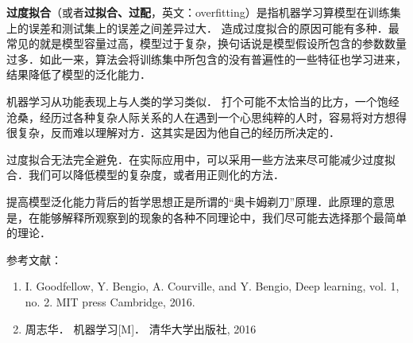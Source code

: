 
\textbf{过度拟合}（或者\textbf{过拟合、过配}，英文：overfitting）是指机器学习算模型在训练集上的误差和测试集上的误差之间差异过大．
造成过度拟合的原因可能有多种．最常见的就是模型容量过高，模型过于复杂，换句话说是模型假设所包含的参数数量过多．如此一来，算法会将训练集中所包含的没有普遍性的一些特征也学习进来，结果降低了模型的泛化能力．

机器学习从功能表现上与人类的学习类似．
打个可能不太恰当的比方，一个饱经沧桑，经历过各种复杂人际关系的人在遇到一个心思纯粹的人时，容易将对方想得很复杂，反而难以理解对方．这其实是因为他自己的经历所决定的．

过度拟合无法完全避免．在实际应用中，可以采用一些方法来尽可能减少过度拟合．我们可以降低模型的复杂度，或者用正则化的方法．

提高模型泛化能力背后的哲学思想正是所谓的“奥卡姆剃刀”原理．此原理的意思是，在能够解释所观察到的现象的各种不同理论中，我们尽可能去选择那个最简单的理论．



参考文献：
\begin{enumerate}
\item I. Goodfellow, Y. Bengio, A. Courville, and Y. Bengio, Deep learning, vol. 1, no. 2. MIT press Cambridge, 2016.
\item 周志华． 机器学习[M]． 清华大学出版社, 2016
\end{enumerate}